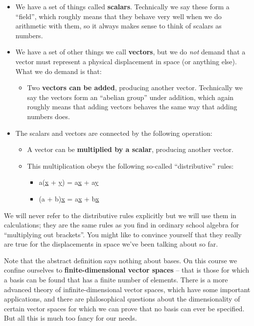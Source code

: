 \documentclass[oneside,english]{amsbook}
\numberwithin{section}{chapter}
\theoremstyle{plain}
\theoremstyle{definition}
\begin{document}
\begin{itemize}
	\item
	We have a set of things called \textbf{scalars}. Technically we say
	these form a ``field'', which roughly means that they behave very well
	when we do arithmetic with them, so it always makes sense to think of
	scalars as numbers.
	\item
	We have a set of other things we call \textbf{vectors}, but we do
	\emph{not} demand that a vector must represent a physical displacement
	in space (or anything else). What we do demand is that:
	
	\begin{itemize}
		\item
		Two \textbf{vectors can be added}, producing another vector.
		Technically we say the vectors form an ``abelian group'' under
		addition, which again roughly means that adding vectors behaves the
		same way that adding numbers does.
	\end{itemize}
	\item
	The scalars and vectors are connected by the following operation:
	
	\begin{itemize}
		\item
		A vector can be \textbf{multiplied by a scalar}, producing another
		vector.
		\item
		This multiplication obeys the following so-called ``distributive''
		rules:
		
		\begin{itemize}
			\item
			a(\ul{x} + \ul{y}) = a\ul{x} + a\ul{y}
			\item
			(a + b)\ul{x} = a\ul{x} + b\ul{x}
		\end{itemize}
	\end{itemize}
\end{itemize}

We will never refer to the distributive rules explicitly but we will use
them in calculations; they are the same rules as you find in ordinary
school algebra for ``multiplying out brackets''. You might like to
convince yourself that they really are true for the displacements in
space we've been talking about so far.

Note that the abstract definition says nothing about bases. On this
course we confine ourselves to \textbf{finite-dimensional vector spaces}
-- that is those for which a basis can be found that has a finite number
of elements. There is a more advanced theory of infinite-dimensional
vector spaces, which have some important applications, and there are
philosophical questions about the dimensionality of certain vector
spaces for which we can prove that no basis can ever be specified. But
all this is much too fancy for our needs.
\end{document}
